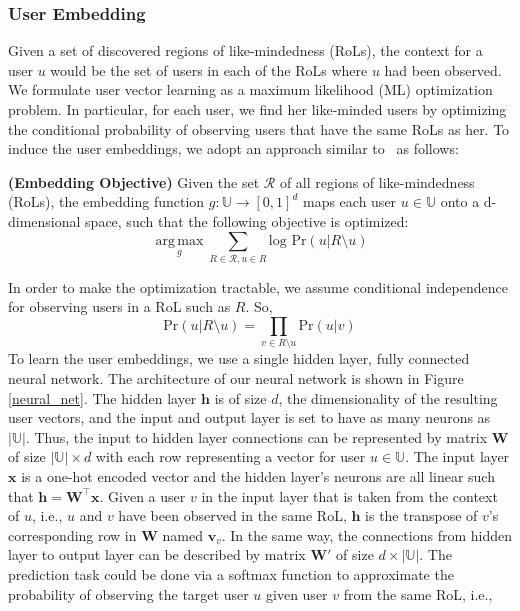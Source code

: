 \documentclass[sigconf]{acmart}
\begin{document}
\subsubsection{User Embedding}
Given a set of discovered regions of like-mindedness (RoLs), the context for a user $u$ would be the set of users in each of the RoLs where $u$ had been observed. We formulate user vector learning as a maximum likelihood (ML) optimization problem. In particular, for each user, we find her like-minded users by optimizing the conditional probability of observing users that have the same RoLs as her. To induce the user embeddings, we adopt an approach similar to~\cite{DBLP:conf/nips/MikolovSCCD13} as follows:

\begin{definition}
\textbf{(Embedding Objective)} Given the set $\mathcal{R}$ of all regions of like-mindedness (RoLs), the embedding function $g:\mathbb{U}\rightarrow{[0,1]^d}$ maps each user $u\in\mathbb{U}$ onto a d-dimensional space, such that the following objective is optimized:
\begin{equation}\label{argmax}
    {\operatorname*{arg\,max}_g\sum_{R\in\mathcal{R},u\in{R}}{\text{log Pr}(u|R\setminus{u})}}
\end{equation}
\end{definition} 

In order to make the optimization tractable, we assume conditional independence for observing users in a RoL such as $R$. So, 
\begin{equation}\label{probability}
    \text{Pr}(u|R\setminus{u})=\prod_{v\in{R\setminus{u}}}{\text{Pr}(u|v)}
\end{equation} 
To learn the user embeddings, we use a single hidden layer, fully connected neural network. The architecture of our neural network is shown in Figure \ref{neural_net}. The hidden layer $\textbf{h}$ is of size $d$, the dimensionality of the resulting user vectors, and the input and output layer is set to have as many neurons as $|\mathbb{U}|$. Thus, the input to hidden layer connections can be represented by matrix $\textbf{W}$ of size $|\mathbb{U}|\times{d}$ with each row representing a vector for user $u\in\mathbb{U}$. The input layer $\textbf{x}$ is a one-hot encoded vector and the hidden layer's neurons are all linear such that $\textbf{h}=\textbf{W}^{\top}\textbf{x}$. Given a user $v$ in the input layer that is taken from the context of $u$, i.e., $u$ and $v$ have been observed in the same RoL, $\textbf{h}$ is the transpose of $v$'s corresponding row in $\textbf{W}$ named $\textbf{v}_v$. In the same way, the connections from hidden layer to output layer can be described by matrix $\textbf{W}'$ of size $d\times|\mathbb{U}|$. The prediction task could be done via a softmax function to approximate the probability of observing the target user $u$ given user $v$ from the same RoL, i.e.,
\end{document}

